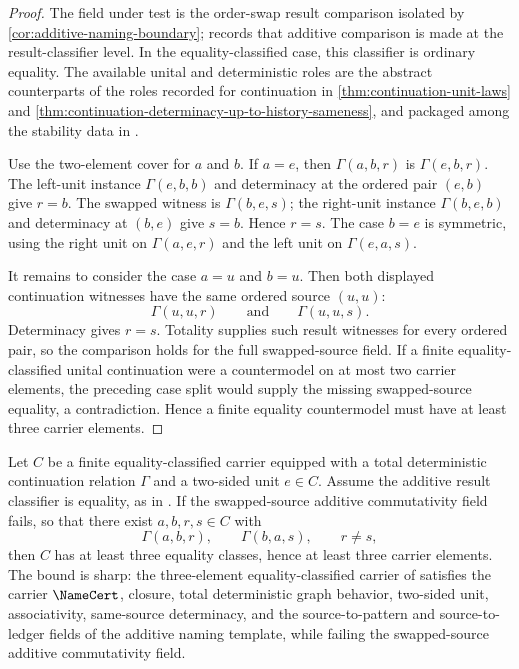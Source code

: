 \begin{proof}
The field under test is the order-swap result comparison isolated by
\autoref{cor:additive-naming-boundary}; 
records that additive comparison is made at the result-classifier level. In the
equality-classified case, this classifier is ordinary equality. The available
unital and deterministic roles are the abstract counterparts of the roles
recorded for continuation in \autoref{thm:continuation-unit-laws} and
\autoref{thm:continuation-determinacy-up-to-history-sameness}, and packaged among
the stability data in .

Use the two-element cover for \(a\) and \(b\). If \(a=e\), then
\(\Gamma(a,b,r)\) is \(\Gamma(e,b,r)\). The left-unit instance
\(\Gamma(e,b,b)\) and determinacy at the ordered pair \((e,b)\) give
\(r=b\). The swapped witness is \(\Gamma(b,e,s)\); the right-unit instance
\(\Gamma(b,e,b)\) and determinacy at \((b,e)\) give \(s=b\). Hence \(r=s\).
The case \(b=e\) is symmetric, using the right unit on \(\Gamma(a,e,r)\) and
the left unit on \(\Gamma(e,a,s)\).

It remains to consider the case \(a=u\) and \(b=u\). Then both displayed
continuation witnesses have the same ordered source \((u,u)\):
$$
  \Gamma(u,u,r)
  \qquad\text{and}\qquad
  \Gamma(u,u,s).
$$
Determinacy gives \(r=s\). Totality supplies such result witnesses for every
ordered pair, so the comparison holds for the full swapped-source field. If a
finite equality-classified unital continuation were a countermodel on at most
two carrier elements, the preceding case split would supply the missing
swapped-source equality, a contradiction. Hence a finite equality countermodel
must have at least three carrier elements.
\end{proof}

\begin{theorem}
\label{thm:three-point-minimal-swapped-add-obstruction}
Let $C$ be a finite equality-classified carrier equipped with a total deterministic continuation relation $\Gamma$ and a two-sided unit $e\in C$. Assume the additive result classifier is equality, as in . If the swapped-source additive commutativity field fails, so that there exist $a,b,r,s\in C$ with
$$
  \Gamma(a,b,r),
  \qquad
  \Gamma(b,a,s),
  \qquad
  r\neq s,
$$
then $C$ has at least three equality classes, hence at least three carrier elements. The bound is sharp: the three-element equality-classified carrier of  satisfies the carrier $\NameCert$, closure, total deterministic graph behavior, two-sided unit, associativity, same-source determinacy, and the source-to-pattern and source-to-ledger fields of the additive naming template, while failing the swapped-source additive commutativity field.
\end{theorem}

